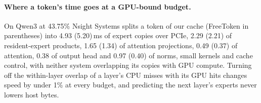 \paragraph{Where a token's time goes at a GPU-bound budget.} On Qwen3 at 43.75\% Nsight Systems splits a token of
our cache (FreeToken in parentheses) into 4.93 (5.20)\,ms of expert copies over PCIe, 2.29 (2.21) of resident-expert
products, 1.65 (1.34) of attention projections, 0.49 (0.37) of attention, 0.38 of output head and 0.97 (0.40) of norms,
small kernels and cache control, with neither system overlapping its copies with GPU compute. Turning off the
within-layer overlap of a layer's CPU misses with its GPU hits changes speed by under 1\% at every budget, and
predicting the next layer's experts \citep{hwang2024pregated,zhu2025preattention} never lowers host bytes.



